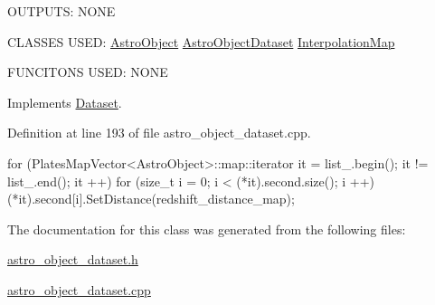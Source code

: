 O\-U\-T\-P\-U\-T\-S\-: N\-O\-N\-E

C\-L\-A\-S\-S\-E\-S U\-S\-E\-D\-: \hyperlink{class_astro_object}{Astro\-Object} \hyperlink{class_astro_object_dataset}{Astro\-Object\-Dataset} \hyperlink{class_interpolation_map}{Interpolation\-Map}

F\-U\-N\-C\-I\-T\-O\-N\-S U\-S\-E\-D\-: N\-O\-N\-E

Implements \hyperlink{class_dataset_a76dbae8574850da55a3b88149ccbe3f9}{Dataset}.



Definition at line 193 of file astro\-\_\-object\-\_\-dataset.\-cpp.


\begin{DoxyCode}
                                                                               
         {
    for (PlatesMapVector<AstroObject>::map::iterator it = list_.begin(); it != 
      list_.end(); it ++){
        for (size_t i = 0; i < (*it).second.size(); i ++){
            (*it).second[i].SetDistance(redshift_distance_map);
        }
    }
        
}
\end{DoxyCode}


The documentation for this class was generated from the following files\-:\begin{DoxyCompactItemize}
\item 
\hyperlink{astro__object__dataset_8h}{astro\-\_\-object\-\_\-dataset.\-h}\item 
\hyperlink{astro__object__dataset_8cpp}{astro\-\_\-object\-\_\-dataset.\-cpp}\end{DoxyCompactItemize}
